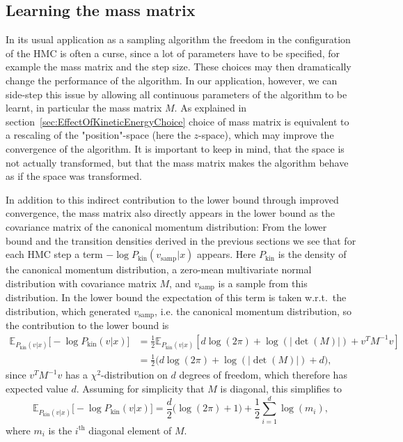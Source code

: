 \documentclass[12pt]{scrartcl}
\newcommand{\E}{\mathbb{E}}
\begin{document}
\subsection{Learning the mass matrix}
\label{sec:MassMatrixChoice}
In its usual application as a sampling algorithm the freedom in the configuration of the HMC is often a curse, since a lot of parameters have to be specified, for example the mass matrix and the step size. These choices may then dramatically change the performance of the algorithm. In our application, however, we can side-step this issue by allowing all continuous parameters of the algorithm to be learnt, in particular the mass matrix $M$. As explained in section~\ref{sec:EffectOfKineticEnergyChoice} choice of mass matrix is equivalent to a rescaling of the "position"-space (here the $z$-space), which may improve the convergence of the algorithm. It is important to keep in mind, that the space is not actually transformed, but that the mass matrix makes the algorithm behave as if the space was transformed.

In addition to this indirect contribution to the lower bound through improved convergence, the mass matrix also directly appears in the lower bound as the covariance matrix of the canonical momentum distribution: From the lower bound and the transition densities derived in the previous sections we see that for each HMC step a term $-\log P_\textrm{kin}(v_\textrm{samp}|x)$ appears. Here $P_\textrm{kin}$ is the density of the canonical momentum distribution, a zero-mean multivariate normal distribution with covariance matrix $M$, and $v_\textrm{samp}$ is a sample from this distribution. In the lower bound the expectation of this term is taken w.r.t.\ the distribution, which generated $v_\textrm{samp}$, i.e. the canonical momentum distribution, so the contribution to the lower bound is
\begin{equation}
\begin{split}
\E_{P_\textrm{kin}(v|x)} \Big[ -\log P_\textrm{kin}(v|x) \Big] &= \frac{1}{2}\E_{P_\textrm{kin}(v|x)} \left[d\log(2 \pi) + \log(|\det(M)|) +  v^T M^{-1} v \right] \\
&= \frac{1}{2} \Big( d \log(2 \pi) + \log(|\det(M)|) + d \Big), 
\end{split}
\end{equation}
since $v^T M^{-1} v$ has a $\chi^2$-distribution on $d$ degrees of freedom, which therefore has expected value $d$. Assuming for simplicity that $M$ is diagonal, this simplifies to
\begin{equation}
\E_{P_\textrm{kin}(v|x)} \Big[ -\log P_\textrm{kin}(v|x) \Big] = \frac{d}{2} \Big( \log(2 \pi) + 1 \Big) + \frac{1}{2} \sum_{i=1}^d \log(m_i),
\end{equation}
where $m_i$ is the $i^{\textrm{th}}$ diagonal element of $M$.
\end{document}
